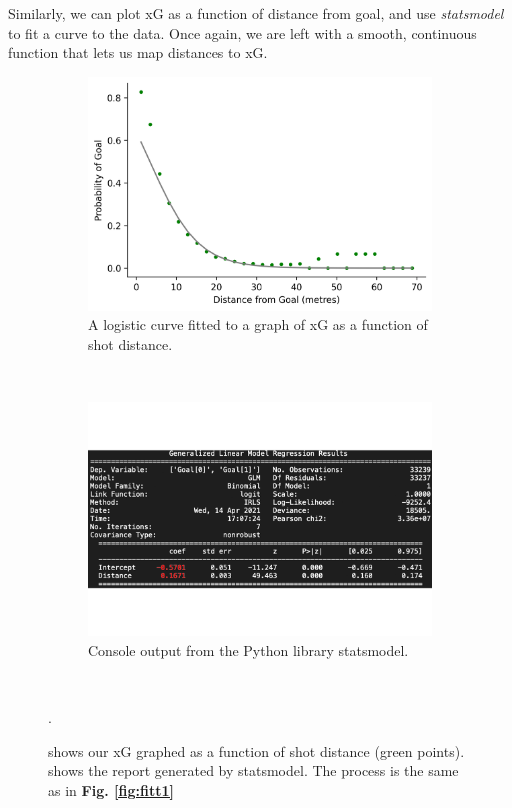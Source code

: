 \documentclass{l4proj}
\begin{document}
Similarly, we can plot xG as a function of distance from goal, and use \textit{statsmodel} to fit a curve to the data. Once again, we are left with a smooth, continuous function that lets us map distances to xG.

\begin{figure}[htb] 
    \centering
    \begin{subfigure}[b]{0.45\textwidth}
        \includegraphics[width=\textwidth]{images/distfit.png}
        \caption{A logistic curve fitted to a graph of xG as a function of shot distance.}
        \label{fig:disfit}
    \end{subfigure}
    ~
    \begin{subfigure}[b]{0.45\textwidth}
        \includegraphics[width=\textwidth]{images/statsmodeloutput2.png}
        \caption{Console output from the Python library statsmodel.}
        \label{fig:smout2}
    \end{subfigure}
    ~   
    \caption{ shows our xG graphed as a function of shot distance (green points).  shows the report generated by statsmodel. The process is the same as in \textbf{Fig. \ref{fig:fitt1}}}.
    \label{fig:fitt2}
\end{figure}
\end{document}
